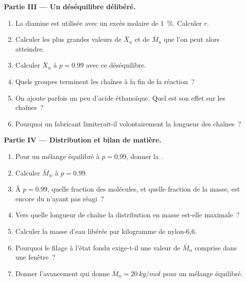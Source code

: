 \begin{problem}
\medskip
\noindent\textbf{Partie III --- Un déséquilibre délibéré.}
\begin{enumerate}[resume]
  \item La diamine est utilisée avec un excès molaire de 1~\%. Calculer $r$.
  \item Calculer les plus grandes valeurs de $\bar X_n$ et de $\bar M_n$ que l'on peut alors atteindre.
  \item Calculer $\bar X_n$ à $p = 0.99$ avec ce déséquilibre.
  \item Quels groupes terminent les chaînes à la fin de la réaction~?
  \item On ajoute parfois un peu d'acide éthanoïque. Quel est son effet sur les chaînes~?
  \item Pourquoi un fabricant limiterait-il volontairement la longueur des chaînes~?
\end{enumerate}

\medskip
\noindent\textbf{Partie IV --- Distribution et bilan de matière.}
\begin{enumerate}[resume]
  \item Pour un mélange équilibré à $p = 0.99$, donner la .
  \item Calculer $\bar M_w$ à $p = 0.99$.
  \item À $p = 0.99$, quelle fraction des molécules, et quelle fraction de la masse, est encore du
         n'ayant pas réagi~?
  \item Vers quelle longueur de chaîne la distribution en masse est-elle maximale~?
  \item Calculer la masse d'eau libérée par kilogramme de nylon-6,6.
  \item Pourquoi le filage à l'état fondu exige-t-il une valeur de $\bar M_n$ comprise dans une fenêtre~?
  \item Donner l'avancement qui donne $\bar M_n = \qty{20}{kg/mol}$ pour un mélange équilibré.
\end{enumerate}
\end{problem}
